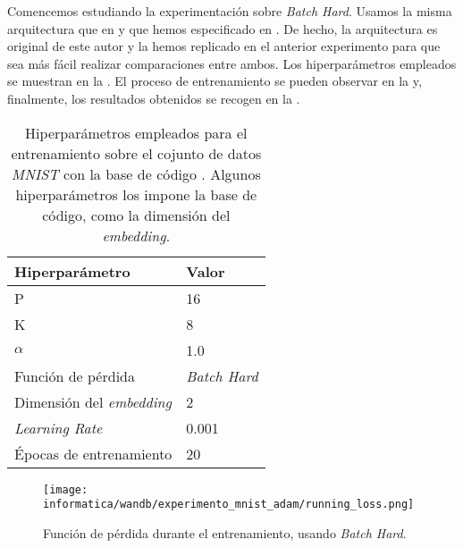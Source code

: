 Comencemos estudiando la experimentación sobre \textit{Batch Hard}. Usamos la misma arquitectura que en  y que hemos especificado en . De hecho, la arquitectura es original de este autor y la hemos replicado en el anterior experimento para que sea más fácil realizar comparaciones entre ambos. Los hiperparámetros empleados se muestran en la . El proceso de entrenamiento se pueden observar en la  y, finalmente, los resultados obtenidos se recogen en la .

\begin{table}[!hbtp]
\centering
\begin{tabular}{|l|l|}
    \hline
    Hiperparámetro & Valor \\
    \hline

    P & 16 \\
    K & 8 \\
    $\alpha$ & 1.0 \\
    Función de pérdida & \textit{Batch Hard} \\
    Dimensión del \textit{embedding} & 2 \\
    \textit{Learning Rate} & 0.001 \\
    Épocas de entrenamiento & 20 \\
    \hline
\end{tabular}
    \caption{Hiperparámetros empleados para el entrenamiento sobre el cojunto de datos \textit{MNIST} con la base de código \cite{informatica:adambielski_github}. Algunos hiperparámetros los impone la base de código, como la dimensión del \textit{embedding}.}
    \label{table:hp_adam_mnist}
\end{table}

\begin{figure}[!hbtp]
    \centering
    \texttt{[image: informatica/wandb/experimento\_mnist\_adam/running\_loss.png]}
    \caption{Función de pérdida durante el entrenamiento, usando \textit{Batch Hard}.}
    \label{img:proceso_entrenamiento_adam_mnist}
\end{figure}


